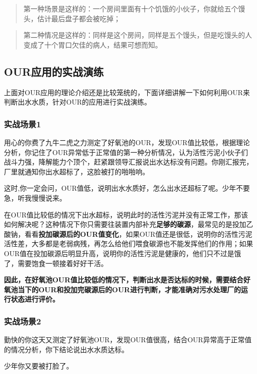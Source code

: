 \documentclass[]{book}
\begin{document}
\begin{quote}
第一种场景是这样的：一个房间里面有十个饥饿的小伙子，你就给五个馒头，估计最后盘子都会被吃掉；
\end{quote}

\begin{quote}
第二种情况是这样的：同样是这个房间，同样是五个馒头，但是吃馒头的人变成了十个胃口欠佳的病人，结果可想而知。
\end{quote}

\subsection{OUR应用的实战演练}\label{our}

上面对OUR应用的理论介绍还是比较笼统的，下面详细讲解一下如何利用OUR来判断出水水质，针对OUR的应用进行实战演练。

\subsubsection{实战场景1}\label{1}

用心的你费了九牛二虎之力测定了好氧池的OUR，发现OUR值比较低，根据理论分析，你记住了OUR异常低于正常值的第一种分析情况，认为活性污泥小伙子们战斗力强，降解能力个顶个，赶紧跟领导汇报说出水达标没有问题。你刚汇报完，厂里就通知你出水超标了，这脸被打的啪啪响。

这时,你一定会问，OUR值低，说明出水水质好，怎么出水还超标了呢。少年不要急，听我慢慢说来。

在OUR值比较低的情况下出水超标，说明此时的活性污泥并没有正常工作，那该如何解决呢？这种情况下你只需要往装置内部补充\textbf{足够的碳源}，最常见的是投加乙酸钠，看看\textbf{投加碳源后的OUR值变化}，如果OUR值还是很低，说明你的活性污泥活性差，大多都是老弱病残，再怎么给他们喂食碳源也不能发挥他们的作用；如果OUR值在投加碳源后明显升高，说明你的活性污泥是健康的，他们只不过是饿了，需要饱食一顿接着好好干活。

\textbf{因此，在好氧池OUR值比较低的情况下，判断出水是否达标的时候，需要结合好氧池当下的OUR和投加完碳源后的OUR进行判断，才能准确对污水处理厂的运行状态进行评价。}

\subsubsection{实战场景2}\label{2}

勤快的你这天又测定了好氧池OUR，发现OUR值很高，结合OUR异常高于正常值的情况分析，你下结论说出水水质达标。

少年你又要被打脸了。
\end{document}
